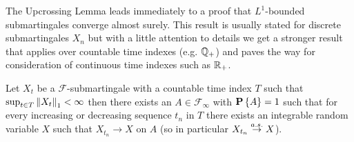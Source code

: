 The Upcrossing Lemma leads immediately to a proof that $L^1$-bounded
submartingales converge almost surely.  This result is usually stated
for discrete submartingales $X_n$ but with a little attention to details
we get a stronger result that applies over countable time indexes
(e.g. $\mathbb{Q}_+$) and paves the way for consideration of
continuous time indexes such as $\mathbb{R}_+$.
\begin{thm}\label{MartingaleConvergenceBoundedL1Discrete}Let $X_t$ be a
  $\mathcal{F}$-submartingale with a countable time index $T$ such that $\sup_{t \in
    T} \left \lVert X_t \right \rVert_1 <
  \infty$ then there exists an $A \in \mathcal{F}_\infty$ with
  $\textbf{P}\left \{A \right \} = 1$ such that for every increasing or
  decreasing sequence $t_n$ in $T$ there exists an integrable random variable $X$ such
  that $X_{t_n} \to X$ on $A$ (so in particular $X_{t_n} \overset{a.s.}\to X$).
\end{thm}
